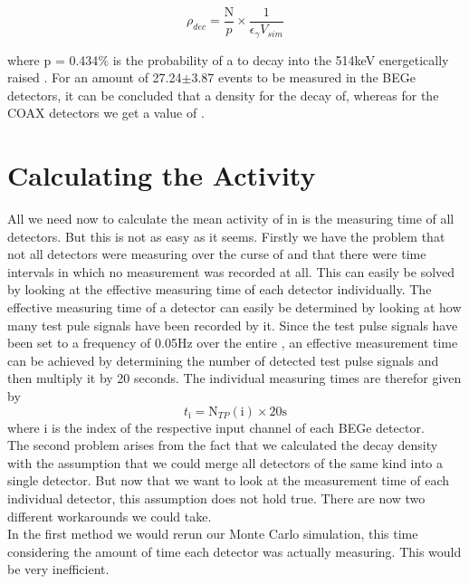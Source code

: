 \begin{equation}
\rho_{dec} = \frac{\mathrm{N}}{p}\times\frac{1}{\epsilon_\gamma V_{sim}}
\label{equ:density}
\end{equation}

where p = 0.434$\%$ is the probability of a \Kr to decay into the 514keV energetically raised .
For an amount of 27.24\(\pm\)3.87 events to be measured in the BEGe detectors, it can be concluded that a density for the \Kr decay of, whereas for the COAX detectors we get a value of . 
\\


\section{Calculating the Activity}
\label{sec:CalcActiv}

All we need now to calculate the mean activity of \Kr in \PII is the measuring time of all detectors.
But this is not as easy as it seems.
Firstly we have the problem that not all detectors were measuring over the curse of \PII and that there were time intervals in which no measurement was recorded at all.
This can easily be solved by looking at the effective measuring time of each detector individually.
The effective measuring time of a detector can easily be determined by looking at how many test pule signals have been recorded by it. 
Since the test pulse signals have been set to a frequency of 0.05Hz over the entire \PII, an effective measurement time can be achieved by determining the number of detected test pulse signals and then multiply it by 20 seconds.
The individual measuring times are therefor given by
\begin{equation*}
    t_\mathrm{i} = \mathrm{N}_{TP}(\mathrm{i}) \times 20\mathrm{s}
\end{equation*}
where i is the index of the respective input channel of each BEGe detector.
\\

The second problem arises from the fact that we calculated the decay density with the assumption that we could merge all detectors of the same kind into a single detector.
But now that we want to look at the measurement time of each individual detector, this assumption does not hold true.
There are now two different workarounds we could take.
\\

In the first method we would rerun our Monte Carlo simulation, this time considering the amount of time each detector was actually measuring.
This would be very inefficient.
\\

